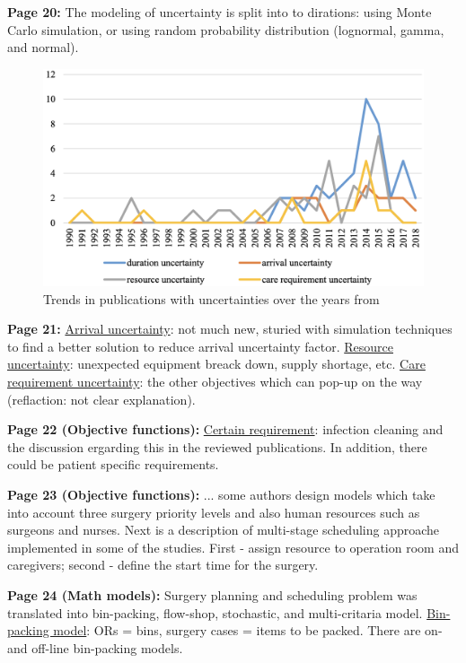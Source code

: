     \textbf{Page 20:}
    The modeling of uncertainty is split into to dirations: using Monte Carlo simulation, or using random probability distribution (lognormal, gamma, and normal).
    \begin{figure}[H]
        \centering
        \includegraphics[width=1\textwidth]{figures/0013_SR01CN19/fig6.png}
        \caption{Trends in publications with uncertainties over the years from \cite{x203}}
        \label{fig6:0013_SR01CN19}
    \end{figure}

    \textbf{Page 21:}
    \underline{Arrival uncertainty}: not much new, sturied with simulation techniques to find a better solution to reduce arrival uncertainty factor. \underline{Resource uncertainty}: unexpected equipment breack down, supply shortage, etc. \underline{Care requirement uncertainty}: the other objectives which can pop-up on the way (reflaction: not clear explanation).
    
    \textbf{Page 22 (Objective functions):}
    \underline{Certain requirement}: infection cleaning and the discussion ergarding this in the reviewed publications. In addition, there could be patient specific requirements. 
    
    \textbf{Page 23 (Objective functions):}
    ... some authors design models which take into account three surgery priority levels and also human resources such as surgeons and nurses. Next is a description of multi-stage scheduling approache implemented in some of the studies. First - assign resource to operation room and caregivers; second - define the start time for the surgery. 
    
    \textbf{Page 24 (Math models):}
    Surgery planning and scheduling problem was translated into bin-packing, flow-shop, stochastic, and multi-critaria model. \underline{Bin-packing model}: ORs = bins, surgery cases = items to be packed. There are on- and off-line bin-packing models.
    

